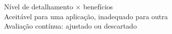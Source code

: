 \documentclass[preview]{standalone}
\begin{document}
Nível de detalhamento × benefícios\\Aceitável para uma aplicação, inadequado para outra\\Avaliação contínua: ajustado ou descartado\\
\end{document}
